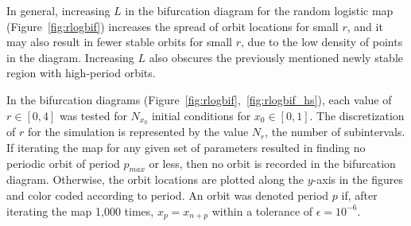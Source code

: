 In general, increasing $L$ in the bifurcation diagram for the random
logistic map (Figure~\ref{fig:rlogbif}) increases the spread of orbit
locations for small $r$, and it may also result in fewer stable orbits
for small $r$, due to the low density of points in the
diagram. Increasing $L$ also obscures the previously mentioned newly
stable region with high-period orbits.

In the bifurcation diagrams
(Figure~\ref{fig:rlogbif},~\ref{fig:rlogbif_hs}), each value of $r \in
[0,4]$ was tested for $N_{x_0}$ initial conditions for $x_0 \in [0,1]$. The discretization
of $r$ for the simulation is represented by the value $N_r$, the
number of subintervals. If iterating the map for any given set of
parameters resulted in finding no periodic orbit of period $p_{max}$
or less, then no orbit is recorded in the bifurcation
diagram. Otherwise, the orbit locations are plotted along the $y$-axis
in the figures and color coded according to period. An orbit was
denoted period $p$ if, after iterating the map 1,000 times,
$x_p=x_{n+p}$ within a tolerance of $\epsilon = 10^{-6}$.

